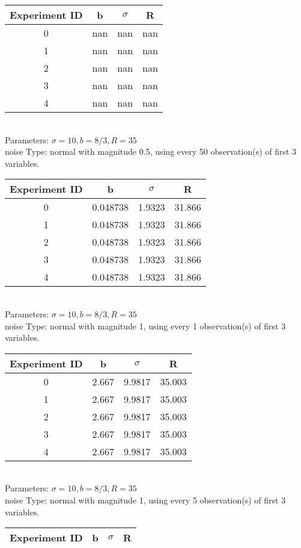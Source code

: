 \begin{multicols}{3}
\begin{tabular}{cccc}
\hline Experiment ID & b & $\sigma$ & R \\ \hline 
0 & nan & nan & nan\\ \hline 
 1 & nan & nan & nan\\ \hline 
 2 & nan & nan & nan\\ \hline 
 3 & nan & nan & nan\\ \hline 
 4 & nan & nan & nan\\ \hline 
 \end{tabular}\\
Parameters: $\sigma=10, b=8/3, R=35$\\
noise Type: normal with magnitude 0.5, using every 50 observation(s) of first 3 variables.\\
\begin{tabular}{cccc}
\hline Experiment ID & b & $\sigma$ & R \\ \hline 
0 & 0.048738 & 1.9323 & 31.866\\ \hline 
 1 & 0.048738 & 1.9323 & 31.866\\ \hline 
 2 & 0.048738 & 1.9323 & 31.866\\ \hline 
 3 & 0.048738 & 1.9323 & 31.866\\ \hline 
 4 & 0.048738 & 1.9323 & 31.866\\ \hline 
 \end{tabular}\\
Parameters: $\sigma=10, b=8/3, R=35$\\
noise Type: normal with magnitude 1, using every 1 observation(s) of first 3 variables.\\
\begin{tabular}{cccc}
\hline Experiment ID & b & $\sigma$ & R \\ \hline 
0 & 2.667 & 9.9817 & 35.003\\ \hline 
 1 & 2.667 & 9.9817 & 35.003\\ \hline 
 2 & 2.667 & 9.9817 & 35.003\\ \hline 
 3 & 2.667 & 9.9817 & 35.003\\ \hline 
 4 & 2.667 & 9.9817 & 35.003\\ \hline 
 \end{tabular}\\
Parameters: $\sigma=10, b=8/3, R=35$\\
noise Type: normal with magnitude 1, using every 5 observation(s) of first 3 variables.\\
\begin{tabular}{cccc}
\hline Experiment ID & b & $\sigma$ & R \\ \hline 

\end{tabular}
\end{multicols}
